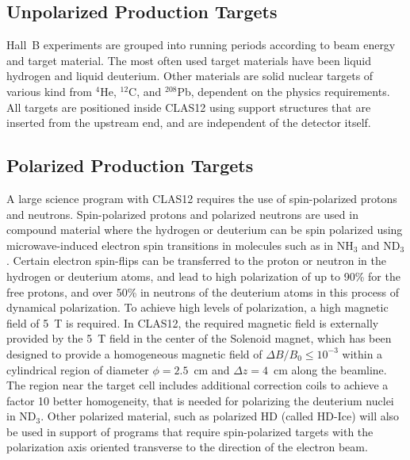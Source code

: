 \documentclass[final,3p,times,twocolumn,authoryear]{elsarticle}
\begin{document}
\subsection{Unpolarized Production Targets} 

Hall~B experiments are grouped into running periods according to beam energy and target material. The most often used
target materials have been liquid hydrogen and liquid deuterium. Other materials are solid nuclear targets of various kind
from $^4$He, $^{12}$C, and $^{208}$Pb, dependent on the physics requirements. All targets are positioned inside CLAS12
using support structures that are inserted from the upstream end, and are independent of the detector itself.

\subsection{Polarized Production Targets} 

A large science program with CLAS12 requires the use of spin-polarized protons and neutrons. Spin-polarized protons and
polarized neutrons are used in compound material where the hydrogen or deuterium can be spin polarized using
microwave-induced electron spin transitions in molecules such as in NH$_3$ and ND$_3$. Certain electron spin-flips
can be transferred to the proton or neutron in the hydrogen or deuterium atoms, and lead to high polarization of up to 90\%
for the free protons, and over 50\% in neutrons of the deuterium atoms in this process of dynamical polarization. To achieve 
high levels of polarization, a high magnetic field of 5~T is required. In CLAS12, the required magnetic field is externally 
provided by the 5~T field in the center of the Solenoid magnet, which has been designed to provide a homogeneous magnetic
field of $\Delta B / B_0 \leq 10^{-3}$ within a cylindrical region of diameter $\phi = 2.5$~cm and $\Delta{z} = 4$~cm along
the beamline. The region near the target cell includes additional correction coils to achieve a factor 10 better homogeneity,
that is needed for polarizing the deuterium nuclei in ND$_3$. Other polarized material, such as polarized HD (called HD-Ice)  
will also be used in support of programs that require spin-polarized targets with the polarization axis oriented transverse to
the direction of the electron beam.        
\end{document}
